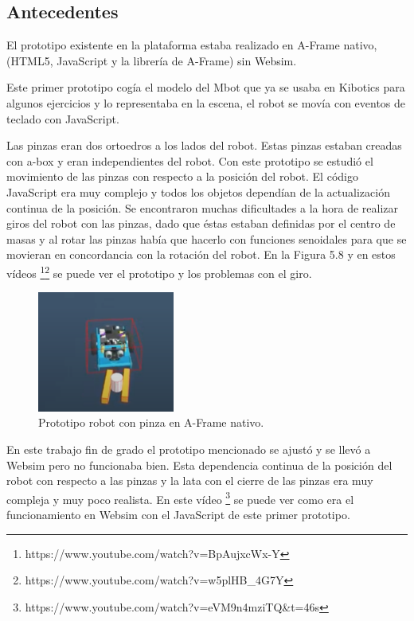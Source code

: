 \subsection{Antecedentes}
El prototipo existente en la plataforma estaba realizado en A-Frame nativo, (HTML5, JavaScript y la librería de A-Frame) sin Websim.

Este primer prototipo cogía el modelo del Mbot que ya se usaba en Kibotics para algunos ejercicios y lo representaba en la escena, el robot se movía con eventos de teclado con JavaScript. 

Las pinzas eran dos ortoedros a los lados del robot. Estas pinzas estaban creadas con a-box y eran  independientes del robot. Con este prototipo se estudió el movimiento de las pinzas con respecto a la posición del robot. El código JavaScript era muy complejo y todos los objetos dependían de la actualización continua de la posición. 
Se encontraron muchas dificultades a la hora de realizar giros del robot con las pinzas, dado que éstas estaban definidas por el centro de masas y al rotar las pinzas había que hacerlo con funciones senoidales para que se movieran en concordancia con la rotación del robot. En la Figura 5.8 y en estos vídeos \footnote{https://www.youtube.com/watch?v=BpAujxcWx-Y}\footnote{https://www.youtube.com/watch?v=w5plHB\_4G7Y} se puede ver el prototipo y los problemas con el giro.

 \begin{figure}[H]
  \centering
 \includegraphics[width=0.40\textwidth]{chapters/images/prototipo.png}
  \caption{Prototipo robot con pinza en A-Frame nativo.}
\end{figure}

En este trabajo fin de grado el prototipo mencionado se ajustó y se llevó a Websim pero no funcionaba bien. Esta dependencia continua de la posición del robot con respecto a las pinzas y la lata con el cierre de las pinzas era muy compleja y muy poco realista. En este vídeo  \footnote{https://www.youtube.com/watch?v=eVM9n4mziTQ\&t=46s} se puede ver como era el funcionamiento en Websim con el JavaScript de este primer prototipo.  


